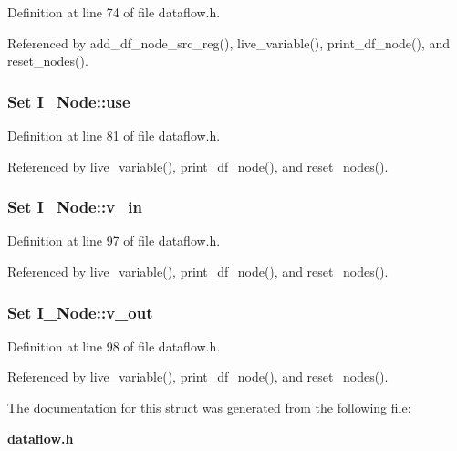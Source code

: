 Definition at line 74 of file dataflow.h.

Referenced by add\_\-df\_\-node\_\-src\_\-reg(), live\_\-variable(), print\_\-df\_\-node(), and reset\_\-nodes().
\subsubsection{\setlength{\rightskip}{0pt plus 5cm}\bf{Set} \bf{I\_\-Node::use}}\label{structI__Node_24e5c28d798c00a922ac517277a18e36}




Definition at line 81 of file dataflow.h.

Referenced by live\_\-variable(), print\_\-df\_\-node(), and reset\_\-nodes().
\subsubsection{\setlength{\rightskip}{0pt plus 5cm}\bf{Set} \bf{I\_\-Node::v\_\-in}}\label{structI__Node_7237b59681f12803c7c205fe915a5bad}




Definition at line 97 of file dataflow.h.

Referenced by live\_\-variable(), print\_\-df\_\-node(), and reset\_\-nodes().
\subsubsection{\setlength{\rightskip}{0pt plus 5cm}\bf{Set} \bf{I\_\-Node::v\_\-out}}\label{structI__Node_ec764c2399616ced8520b1e6a26d28b0}




Definition at line 98 of file dataflow.h.

Referenced by live\_\-variable(), print\_\-df\_\-node(), and reset\_\-nodes().

The documentation for this struct was generated from the following file:\begin{CompactItemize}
\item 
\bf{dataflow.h}\end{CompactItemize}
